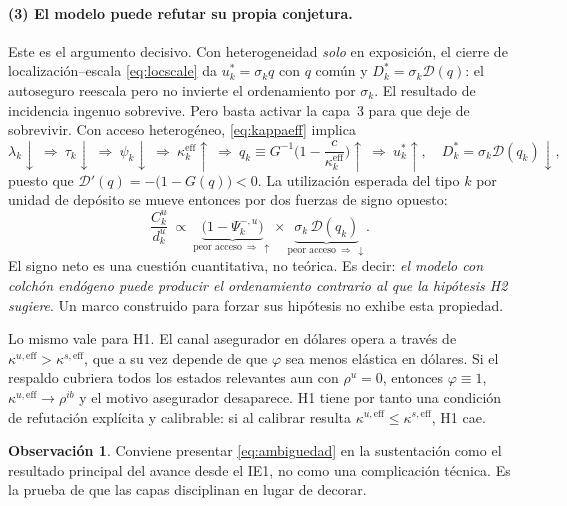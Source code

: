 \documentclass[11pt]{article}
\newcommand{\keff}{\kappa^{\mathrm{eff}}}
\theoremstyle{definition}
\newtheorem{obs}{Observaci\'on}
\begin{document}
\paragraph{(3) El modelo puede refutar su propia conjetura.} Este es el
argumento decisivo. Con heterogeneidad \emph{solo} en exposici\'on, el cierre de
localizaci\'on--escala \eqref{eq:locscale} da $u^*_k=\sigma_k q$ con $q$ com\'un y
$D^*_k=\sigma_k\mathcal{D}(q)$: el autoseguro reescala pero no invierte el
ordenamiento por $\sigma_k$. El resultado de incidencia ingenuo sobrevive. Pero
basta activar la capa~3 para que deje de sobrevivir. Con acceso heterog\'eneo,
\eqref{eq:kappaeff} implica
\begin{equation}
\lambda_k\downarrow\ \Longrightarrow\ \tau_k\downarrow\ \Longrightarrow\
\psi_k\downarrow\ \Longrightarrow\ \keff_k\uparrow\ \Longrightarrow\
q_k\equiv G^{-1}\!\Big(1-\frac{c}{\keff_k}\Big)\uparrow\ \Longrightarrow\
u^*_k\uparrow,\quad D^*_k=\sigma_k\mathcal{D}(q_k)\downarrow,
\label{eq:cadena}
\end{equation}
puesto que $\mathcal{D}'(q)=-\big(1-G(q)\big)<0$. La utilizaci\'on esperada del
tipo $k$ por unidad de dep\'osito se mueve entonces por dos fuerzas de signo
opuesto:
\begin{equation}
\frac{C^u_k}{d^u_k}\ \propto\
\underbrace{\big(1-\Psi^{-,u}_k\big)}_{\text{peor acceso}\ \Rightarrow\ \uparrow}
\times
\underbrace{\sigma_k\,\mathcal{D}(q_k)}_{\text{peor acceso}\ \Rightarrow\ \downarrow}.
\label{eq:ambiguedad}
\end{equation}
El signo neto es una cuesti\'on cuantitativa, no te\'orica. Es decir: \emph{el
modelo con colch\'on end\'ogeno puede producir el ordenamiento contrario al que la
hip\'otesis H2 sugiere}. Un marco construido para forzar sus hip\'otesis no
exhibe esta propiedad.

Lo mismo vale para H1. El canal asegurador en d\'olares opera a trav\'es de
$\kappa^{u,\mathrm{eff}}>\kappa^{s,\mathrm{eff}}$, que a su vez depende de que
$\varphi$ sea menos el\'astica en d\'olares. Si el respaldo cubriera todos los
estados relevantes aun con $\rho^u=0$, entonces $\varphi\equiv 1$,
$\kappa^{u,\mathrm{eff}}\to\rho^{ib}$ y el motivo asegurador desaparece. H1 tiene
por tanto una condici\'on de refutaci\'on expl\'icita y calibrable: si al calibrar
resulta $\kappa^{u,\mathrm{eff}}\le\kappa^{s,\mathrm{eff}}$, H1 cae.

\begin{obs}
Conviene presentar \eqref{eq:ambiguedad} en la sustentaci\'on como el resultado
principal del avance desde el IE1, no como una complicaci\'on t\'ecnica. Es la
prueba de que las capas disciplinan en lugar de decorar.
\end{obs}
\end{document}
